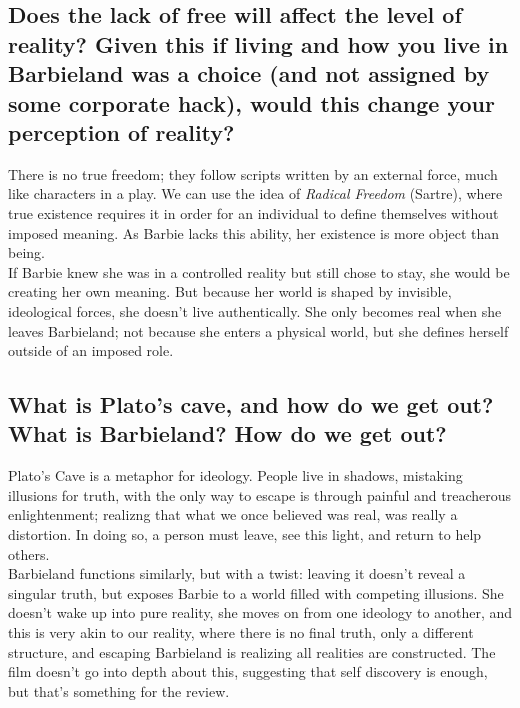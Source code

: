 \subsection{Does the lack of free will affect the level of reality? Given this if living and
how you live in Barbieland was a choice (and not assigned by some corporate hack), would this change
your perception of reality?}

There is no true freedom; they follow scripts written by an external force, much like characters in a play. 
We can use the idea of \textit{Radical Freedom} (Sartre), where true existence requires it in order for an individual 
to define themselves without imposed meaning. As Barbie lacks this ability, her existence is more object
than being. \\

If Barbie knew she was in a controlled reality but still chose to stay, she would be creating her own meaning.
But because her world is shaped by invisible, ideological forces, she doesn't live authentically. She only becomes
real when she leaves Barbieland; not because she enters a physical world, but she defines herself outside of an imposed role. \\

\subsection{What is Plato's cave, and how do we get out? What is Barbieland? How do we get out?}

Plato's Cave is a metaphor for ideology. People live in shadows, mistaking illusions for truth, with
the only way to escape is through painful and treacherous enlightenment; realizng that 
what we once believed was real, was really a distortion. In doing so, a person must leave, see this light, and
return to help others. \\

Barbieland functions similarly, but with a twist: leaving it doesn't reveal a singular truth, but exposes Barbie to a world
filled with competing illusions. She doesn't wake up into pure reality, she moves on from one 
ideology to another, and this is very akin to our reality, where there is no final truth, 
only a different structure, and escaping Barbieland is realizing all realities are constructed.
The film doesn't go into depth about this, suggesting that self discovery is enough, but that's something for the review. \\

